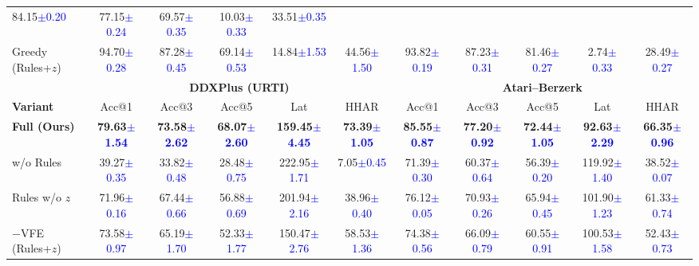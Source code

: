 \documentclass{article} %
\newcommand{\revise}[1]{\textcolor{blue}{#1}}
\begin{document}
\begin{table}[!t]
{\begin{tabular}{lccccc|ccccc}
84.15\revise{${\pm}$\tiny{0.20}} & 77.15\revise{${\pm}$\tiny{0.24}} & 69.57\revise{${\pm}$\tiny{0.35}} & 10.03\revise{${\pm}$\tiny{0.33}} & 33.51\revise{${\pm}$\tiny{0.35}} \\
Greedy (Rules+$z$) & 94.70\revise{${\pm}$\tiny{0.28}} & 87.28\revise{${\pm}$\tiny{0.45}} & 69.14\revise{${\pm}$\tiny{0.53}} & 14.84\revise{${\pm}$\tiny{1.53}} & 44.56\revise{${\pm}$\tiny{1.50}} &
93.82\revise{${\pm}$\tiny{0.19}} & 87.23\revise{${\pm}$\tiny{0.31}} & 81.46\revise{${\pm}$\tiny{0.27}} & 2.74\revise{${\pm}$\tiny{0.33}} & 28.49\revise{${\pm}$\tiny{0.27}} \\
\midrule
& \multicolumn{5}{c}{\textbf{DDXPlus (URTI)}} & \multicolumn{5}{c}{\textbf{Atari--Berzerk}} \\
\cmidrule(lr){2-6}\cmidrule(lr){7-11}
\textbf{Variant} & Acc@1 & Acc@3 & Acc@5 & Lat & HHAR & Acc@1 & Acc@3 & Acc@5 & Lat & HHAR \\
\midrule
\textbf{Full (Ours)} & \textbf{79.63\revise{${\pm}$\tiny{1.54}}} & \textbf{73.58\revise{${\pm}$\tiny{2.62}}} & \textbf{68.07\revise{${\pm}$\tiny{2.60}}} & \textbf{159.45\revise{${\pm}$\tiny{4.45}}} & \textbf{73.39\revise{${\pm}$\tiny{1.05}}} &
\textbf{85.55\revise{${\pm}$\tiny{0.87}}} & \textbf{77.20\revise{${\pm}$\tiny{0.92}}} & \textbf{72.44\revise{${\pm}$\tiny{1.05}}} & \textbf{92.63\revise{${\pm}$\tiny{2.29}}} & \textbf{66.35\revise{${\pm}$\tiny{0.96}}} \\
w/o Rules & 39.27\revise{${\pm}$\tiny{0.35}} & 33.82\revise{${\pm}$\tiny{0.48}} & 28.48\revise{${\pm}$\tiny{0.75}} & 222.95\revise{${\pm}$\tiny{1.71}} & 7.05\revise{${\pm}$\tiny{0.45}} &
71.39\revise{${\pm}$\tiny{0.30}} & 60.37\revise{${\pm}$\tiny{0.64}} & 56.39\revise{${\pm}$\tiny{0.20}} & 119.92\revise{${\pm}$\tiny{1.40}} & 38.52\revise{${\pm}$\tiny{0.07}} \\
Rules w/o $z$ & 71.96\revise{${\pm}$\tiny{0.16}} & 67.44\revise{${\pm}$\tiny{0.66}} & 56.88\revise{${\pm}$\tiny{0.69}} & 201.94\revise{${\pm}$\tiny{2.16}} & 38.96\revise{${\pm}$\tiny{0.40}} &
76.12\revise{${\pm}$\tiny{0.05}} & 70.93\revise{${\pm}$\tiny{0.26}} & 65.94\revise{${\pm}$\tiny{0.45}} & 101.90\revise{${\pm}$\tiny{1.23}} & 61.33\revise{${\pm}$\tiny{0.74}} \\
$-$VFE (Rules+$z$) & 73.58\revise{${\pm}$\tiny{0.97}} & 65.19\revise{${\pm}$\tiny{1.70}} & 52.33\revise{${\pm}$\tiny{1.77}} & 150.47\revise{${\pm}$\tiny{2.76}} & 58.53\revise{${\pm}$\tiny{1.36}} &
74.38\revise{${\pm}$\tiny{0.56}} & 66.09\revise{${\pm}$\tiny{0.79}} & 60.55\revise{${\pm}$\tiny{0.91}} & 100.53\revise{${\pm}$\tiny{1.58}} & 52.43\revise{${\pm}$\tiny{0.73}} \\

\end{tabular}}
\end{table}
\end{document}
